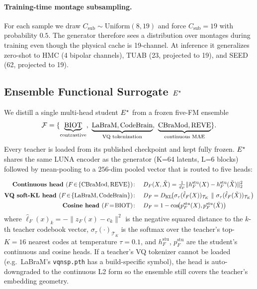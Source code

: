 \paragraph{Training-time montage subsampling.} For each sample we draw $C_{\text{sub}}\!\sim\!\mathrm{Uniform}(8,19)$ and force $C_{\text{sub}}\!=\!19$ with probability $0.5$. The generator therefore sees a distribution over montages during training even though the physical cache is 19-channel. At inference it generalizes zero-shot to HMC (4 bipolar channels), TUAB (23, projected to 19), and SEED (62, projected to 19).

\subsection{Ensemble Functional Surrogate \texorpdfstring{$E^{\star}$}{E*}}
\label{sec:surrogate}

We distill a single multi-head student $E^{\star}$ from a frozen five-FM ensemble
\begin{equation}
\FMset = \{\underbrace{\text{BIOT}}_{\text{contrastive}},\ \underbrace{\text{LaBraM},\text{CodeBrain}}_{\text{VQ tokenization}},\ \underbrace{\text{CBraMod},\text{REVE}}_{\text{continuous MAE}}\}.
\end{equation}
Every teacher is loaded from its published checkpoint and kept fully frozen. $E^{\star}$ shares the same LUNA encoder as the generator (K=64 latents, L=6 blocks) followed by mean-pooling to a $256$-dim pooled vector that is routed to five heads:

\begin{align}
\textbf{Continuous head } (F\!\in\!\{\text{CBraMod},\text{REVE}\})\colon &\quad D_F(X,\Xt) = \tfrac{1}{d_F}\|h_F^{\text{stu}}(X)-h_F^{\text{stu}}(\Xt)\|_2^2 \notag\\
\textbf{VQ soft-KL head } (F\!\in\!\{\text{LaBraM},\text{CodeBrain}\})\colon &\quad D_F = \KL\!\bigl(\sigma_\tau(\hat{\ell}_F(X))_{\mathcal{T}_K}\ \|\ \sigma_\tau(\hat{\ell}_F(\Xt))_{\mathcal{T}_K}\bigr) \notag\\
\textbf{Cosine head } (F\!=\!\text{BIOT})\colon &\quad D_F = 1 - \cos\!\bigl(p_F^{\text{stu}}(X),p_F^{\text{stu}}(\Xt)\bigr) \notag
\end{align}
where $\hat{\ell}_F(x)_k\!=\!-\|z_F(x)-c_k\|^2$ is the negative squared distance to the $k$-th teacher codebook vector, $\sigma_\tau(\cdot)_{\mathcal{T}_K}$ is the softmax over the teacher's top-$K\!=\!16$ nearest codes at temperature $\tau\!=\!0.1$, and $h_F^{\text{stu}}$, $p_F^{\text{stu}}$ are the student's continuous and cosine heads. If a teacher's VQ tokenizer cannot be loaded (e.g.\ LaBraM's \texttt{vqnsp.pth} has a build-specific symbol), the head is auto-downgraded to the continuous L2 form so the ensemble still covers the teacher's embedding geometry.

